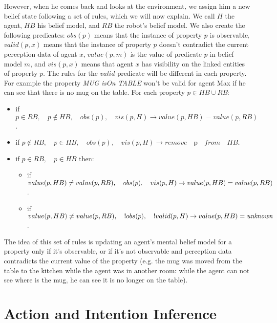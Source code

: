 However, when he comes back and looks at the environment, we assign him a new belief state following a set of rules, which we will now explain. We call $H$ the agent, $HB$ his belief model, and $RB$ the robot's belief model. We also create the following predicates: $obs(p)$ means that the instance of property $p$ is observable, $valid(p,x)$ means that the instance of property $p$ doesn't contradict the current perception data of agent $x$, $value(p,m)$ is the value of predicate $p$ in belief model $m$, and $vis(p,x)$ means that agent $x$ has visibility on the linked entities of property $p$. The rules for the $valid$ predicate will be different in each property. For example the property \textit{MUG isOn TABLE} won't be valid for agent Max if he can see that there is no mug on the table. For each property $p\in HB \cup RB$:
\begin{itemize}
\item if $p \in RB, \quad p\not\in HB,\quad obs(p),\quad vis(p,H) \rightarrow value(p,HB)=value(p,RB)$.
\item if $p \not \in RB,\quad p\in HB,\quad obs(p),\quad vis(p,H) \rightarrow remove\quad $p$ \quad from \quad HB$.
\item if $p\in RB,\quad p\in HB$ then:
	\begin{itemize}
      \item if $value(p,HB)\neq value(p,RB),\\ \quad obs(p),\quad vis(p,H) \rightarrow \\ value(p,HB)=value(p,RB)$.
      \item if $value(p,HB)\neq value(p,RB),\\ \quad !obs(p),\quad !valid(p,H) \rightarrow \\ value(p,HB)=\textit{unknown}$.
	\end{itemize}
\end{itemize}
The idea of this set of rules is updating an agent's mental belief model for a property only if it's observable, or if it's not observable and perception data contradicts the current value of the property (e.g. the mug was moved from the table to the kitchen while the agent was in another room: while the agent can not see where is the mug, he can see it is no longer on the table).



\section{Action and Intention Inference}
\label{situation_assessment-intention_recognition}

